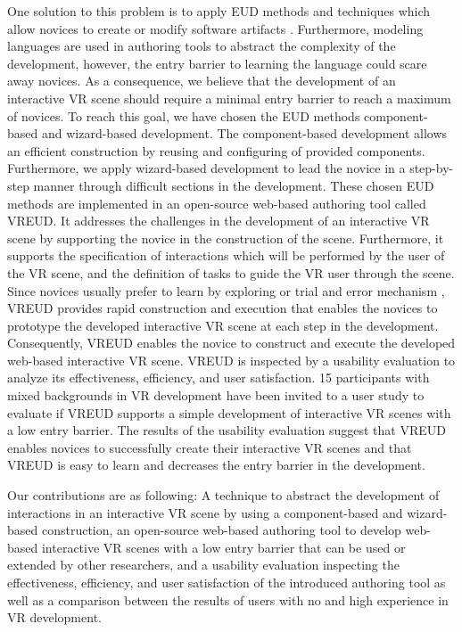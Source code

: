 \documentclass[conference]{IEEEtran}
\begin{document}
One solution to this problem is to apply \ac{EUD} methods and techniques which allow novices to create or modify software artifacts \cite{EUDgrundlage}. Furthermore, modeling languages are used in authoring tools to abstract the complexity of the development, however, the entry barrier to learning the language could scare away novices. As a consequence, we believe that the development of an interactive \ac{VR} scene should require a minimal entry barrier to reach a maximum of novices. To reach this goal, we have chosen the EUD methods component-based and wizard-based development. The component-based development allows an efficient construction by reusing and configuring of provided components. Furthermore, we apply wizard-based development to lead the novice in a step-by-step manner through difficult sections in the development. These chosen \ac{EUD} methods are implemented in an open-source web-based authoring tool called VREUD. It addresses the challenges in the development of an interactive \ac{VR} scene by supporting the novice in the construction of the scene. Furthermore, it supports the specification of interactions which will be performed by the user of the VR scene, and the definition of tasks to guide the VR user through the scene. Since novices usually prefer to learn by exploring or trial and error mechanism \cite{noManual}, VREUD provides rapid construction and execution that enables the novices to prototype the developed interactive \ac{VR} scene at each step in the development. Consequently, VREUD enables the novice to construct and execute the developed web-based interactive \ac{VR} scene.
VREUD is inspected by a usability evaluation to analyze its effectiveness, efficiency, and user satisfaction. 15 participants with mixed backgrounds in \ac{VR} development have been invited to a user study to evaluate if VREUD supports a simple development of interactive VR scenes with a low entry barrier. The results of the usability evaluation suggest that VREUD enables novices to successfully create their interactive VR scenes and that VREUD is easy to learn and decreases the entry barrier in the development. 

Our contributions are as following: A technique to abstract the development of interactions in an interactive \ac{VR} scene by using a component-based and wizard-based construction, an open-source web-based authoring tool to develop web-based interactive \ac{VR} scenes with a low entry barrier that can be used or extended by other researchers, and a usability evaluation inspecting the effectiveness, efficiency, and user satisfaction of the introduced authoring tool as well as a comparison between the results of users with no and high experience in \ac{VR} development.
\end{document}
